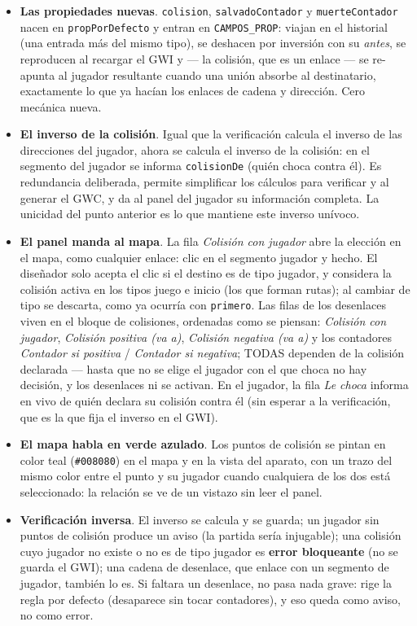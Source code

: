 \begin{itemize}
	\item \textbf{Las propiedades nuevas}. \texttt{colision},
	\texttt{salvadoContador} y \texttt{muerteContador} nacen en
	\texttt{propPorDefecto} y entran en \texttt{CAMPOS\_PROP}: viajan en el historial
	(una entrada más del mismo tipo), se deshacen por inversión con su \emph{antes},
	se reproducen al recargar el GWI y --- la colisión, que es un enlace --- se
	re-apunta al jugador resultante cuando una unión absorbe al destinatario,
	exactamente lo que ya hacían los enlaces de cadena y dirección. Cero mecánica
	nueva.
	\item \textbf{El inverso de la colisión}. Igual que la verificación calcula el
	inverso de las direcciones del jugador, ahora se calcula el inverso de la colisión: en
	el segmento del jugador se informa \texttt{colisionDe} (quién choca contra él). Es
	redundancia deliberada, permite simplificar los cálculos para verificar y al generar el GWC, y da al panel del
	jugador su información completa. La unicidad del punto anterior es lo que
	mantiene este inverso unívoco.
	\item \textbf{El panel manda al mapa}. La fila \emph{Colisión con jugador} abre
	la elección en el mapa, como cualquier enlace: clic en el segmento jugador y
	hecho. El diseñador solo acepta el clic si el destino es de tipo jugador, y
	considera la colisión activa en los tipos juego e inicio (los que forman rutas);
	al cambiar de tipo se descarta, como ya ocurría con \texttt{primero}.
	Las filas de los desenlaces viven en el bloque de colisiones, ordenadas como se
	piensan: \emph{Colisión con jugador}, \emph{Colisión positiva (va a)},
	\emph{Colisión negativa (va a)} y los contadores \emph{Contador si positiva} /
	\emph{Contador si negativa}; TODAS dependen de la colisión declarada --- hasta
	que no se elige el jugador con el que choca no hay decisión, y los desenlaces ni
	se activan. En el jugador, la fila \emph{Le choca} informa en vivo de quién
	declara su colisión contra él (sin esperar a la verificación, que es la que fija
	el inverso en el GWI).
	\item \textbf{El mapa habla en verde azulado}. Los puntos de colisión se pintan en color teal (\texttt{\#008080}) en el mapa y en la vista del aparato, con un trazo
	del mismo color entre el punto y su jugador cuando cualquiera de los dos está
	seleccionado: la relación se ve de un vistazo sin leer el panel.
	\item \textbf{Verificación inversa}. El inverso se calcula y se guarda; un
	jugador sin puntos de colisión produce un aviso (la partida sería injugable);
	una colisión cuyo jugador no existe o no es de tipo jugador es \textbf{error
	bloqueante} (no se guarda el GWI); una cadena de desenlace, que enlace con un
	segmento de jugador, también lo es. Si faltara un desenlace, no pasa
	nada grave: rige la	regla por defecto (desaparece sin tocar contadores), y eso queda como aviso, no como error.

\end{itemize}

